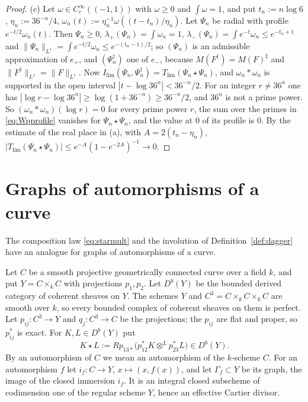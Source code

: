 \documentclass[11pt]{amsart}
\theoremstyle{definition}
\theoremstyle{remark}
\begin{document}
\begin{proof}
(c)  Let $\omega\in C_c^{\infty}((-1,1))$ with $\omega\ge0$ and $\int\omega=1$, and
put $t_n:=n\log6$, $\eta_n:=36^{-n}/4$,
$\omega_n(t):=\eta_n^{-1}\omega((t-t_n)/\eta_n)$.  Let $\Psi_n$ be
radial with profile $e^{-t/2}\omega_n(t)$.  Then $\Psi_n\ge0$,
$\lambda_+(\Psi_n)=\int\omega_n=1$,
$\lambda_-(\Psi_n)=\int e^{-t}\omega_n\le e^{-t_n+1}$ and
$\lVert \Psi_n\rVert_{L^1}=\int e^{-t/2}\omega_n\le e^{-(t_n-1)/2}$; so
$(\Psi_n)$ is an admissible approximation of $e_+$, and $(\Psi_n^{\dagger})$ one of $e_-$,
because $M(F^{\dagger})=M(F)^{\sharp}$ and
$\lVert F^{\dagger}\rVert_{L^1}=\lVert F\rVert_{L^1}$.  Now
$I_{\lim}(\Psi_n,\Psi_n^{\dagger})=T_{\lim}(\Psi_n\star \Psi_n)$, and
$\omega_n*\omega_n$ is supported in the open interval
$|t-\log36^{n}|<36^{-n}/2$.  For an integer $r\ne36^{n}$ one has
$|\log r-\log36^{n}|\ge\log(1+36^{-n})\ge36^{-n}/2$, and $36^{n}$ is not a
prime power.  So $(\omega_n*\omega_n)(\log r)=0$ for every prime power $r$, the
sum over the primes in \eqref{eq:Wpprofile} vanishes for
$\Psi_n\star\Psi_n$, and the value at $0$ of its profile is $0$.  By the estimate of the real place in
(a), with $A=2(t_n-\eta_n)$,
$|T_{\lim}(\Psi_n\star \Psi_n)|\le e^{-A}(1-e^{-2A})^{-1}\to0$.
\end{proof}

\section{Graphs of automorphisms of a curve}\label{sec:classical}

The composition law \eqref{eq:starmult} and the involution of
Definition~\ref{def:dagger} have an analogue for graphs of automorphisms of a
curve.

Let $C$ be a smooth projective geometrically connected curve over a field
$k$, and put $Y=C\times_kC$ with projections $p_1,p_2$.  Let $D^{b}(Y)$ be the
bounded derived category of coherent sheaves on $Y$.  The schemes $Y$ and
$C^{3}=C\times_kC\times_kC$ are smooth over $k$, so every bounded complex of
coherent sheaves on them is perfect.  Let $p_{ij}:C^{3}\to Y$ and
$q_j:C^{3}\to C$ be the projections; the $p_{ij}$ are flat and proper, so
$p_{ij}^{*}$ is exact.  For $K,L\in D^{b}(Y)$ put
\[
K\star L:=Rp_{13*}\bigl(p_{12}^{*}K\otimes^{L}p_{23}^{*}L\bigr)\in D^{b}(Y).
\]
By an automorphism of $C$ we mean an automorphism of the $k$-scheme $C$.  For
an automorphism $f$ let $i_f:C\to Y$, $x\mapsto(x,f(x))$, and let
$\Gamma_f\subset Y$ be its graph, the image of the closed immersion $i_f$.
It is an integral closed subscheme of codimension one of the regular scheme
$Y$, hence an effective Cartier divisor.
\end{document}
